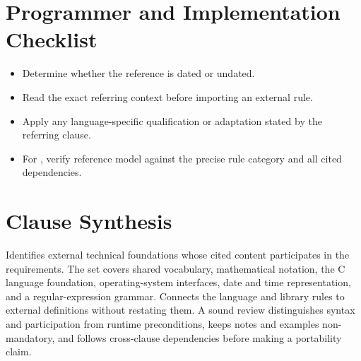 \documentclass[11pt,letterpaper]{article}
\begin{document}
\section{Programmer and Implementation Checklist}
\begin{CornellReferenceChecklistBox}\begin{itemize}[label=$\square$]
\item Determine whether the reference is dated or undated.
\item Read the exact referring context before importing an external rule.
\item Apply any language-specific qualification or adaptation stated by the referring clause.
\item For , verify reference model against the precise rule category and all cited dependencies.
\end{itemize}\end{CornellReferenceChecklistBox}
\section{Clause Synthesis}
\begin{CornellReferenceOrientationBox}Identifies external technical foundations whose cited content participates in the requirements. The set covers shared vocabulary, mathematical notation, the C language foundation, operating-system interfaces, date and time representation, and a regular-expression grammar. Connects the language and library rules to external definitions without restating them. A sound review distinguishes syntax and participation from runtime preconditions, keeps notes and examples non-mandatory, and follows cross-clause dependencies before making a portability claim.\end{CornellReferenceOrientationBox}
\end{document}
